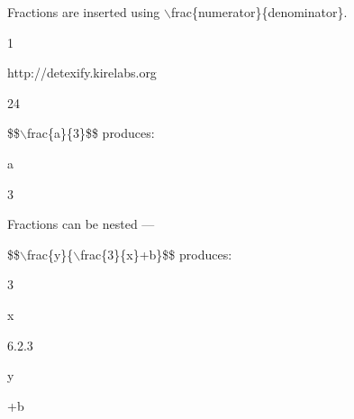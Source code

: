 \documentclass[a4paper,portrait,12pt]{article}
\begin{document}
\begin{flushleft}
Fractions are inserted using \ensuremath{\backslash}frac\{numerator\}\{denominator\}.
\end{flushleft}


1





\begin{flushleft}
http://detexify.kirelabs.org
\end{flushleft}





24





\begin{flushleft}
\newpage
\$\$\ensuremath{\backslash}frac\{a\}\{3\}\$\$ produces:
\end{flushleft}





\begin{flushleft}
a
\end{flushleft}


3





\begin{flushleft}
Fractions can be nested ---
\end{flushleft}


\begin{flushleft}
\$\$\ensuremath{\backslash}frac\{y\}\{\ensuremath{\backslash}frac\{3\}\{x\}+b\}\$\$ produces:
\end{flushleft}


3


\begin{flushleft}
x
\end{flushleft}





6.2.3





\begin{flushleft}
y
\end{flushleft}


\begin{flushleft}
+b
\end{flushleft}
\end{document}

